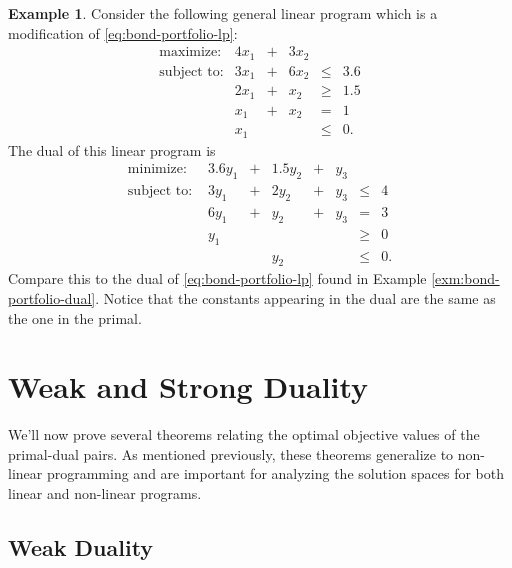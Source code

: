 \documentclass[
]{book}
\theoremstyle{definition}
\theoremstyle{definition}
\newtheorem{example}{Example}[chapter]
\theoremstyle{definition}
\theoremstyle{definition}
\theoremstyle{remark}
\begin{document}
\begin{example}
Consider the following general linear program which is a modification of \eqref{eq:bond-portfolio-lp}:
\begin{equation*}
  \begin{array}{rrrrrl}
  \mbox{maximize:} & 4x_1 & + & 3x_2 \\
  \mbox{subject to:}
    & 3x_1 & + & 6x_2 & \le & 3.6 \\
    & 2x_1 & + & x_2 & \ge & 1.5 \\
    & x_1 & + & x_2 & = & 1 \\
    & x_1 &  &  & \le & 0.
  \end{array}
\end{equation*}
The dual of this linear program is
\begin{equation*}
  \begin{array}{lrrrrrrrrrr}
    \mbox{minimize: } 
      & 3.6 y_1 & + & 1.5 y_2 & + & y_3 \\
    \mbox{subject to: }
      & 3y_1 & + & 2 y_2 & + & y_3 & \leq & 4 \\
      & 6y_1 & + & y_2 & + & y_3 & = & 3 \\
      & y_1 &  & &  & & \geq & 0 \\
      & & & y_2 & & & \leq & 0.
  \end{array}
\end{equation*}
Compare this to the dual of \eqref{eq:bond-portfolio-lp} found in Example
\ref{exm:bond-portfolio-dual}. Notice that the constants appearing in the dual are the same as the
one in the primal.
\end{example}

\hypertarget{weak-and-strong-duality}{%
\chapter{Weak and Strong Duality}\label{weak-and-strong-duality}}

We'll now prove several theorems relating the optimal objective values of the primal-dual pairs.
As mentioned previously, these theorems generalize to non-linear programming and are important for
analyzing the solution spaces for both linear and non-linear programs.

\hypertarget{weak-duality}{%
\section{Weak Duality}\label{weak-duality}}
\end{document}
